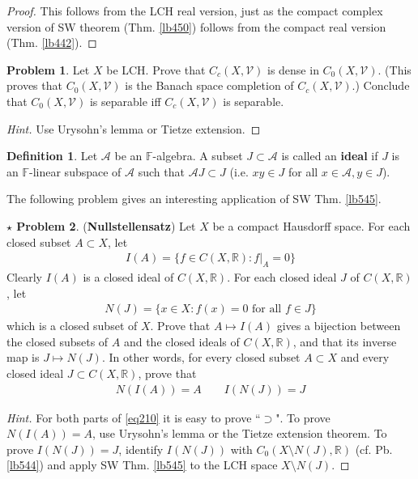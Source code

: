 \documentclass[12pt,b5paper,notitlepage]{article}
\theoremstyle{definition}
\newtheorem{df}{Definition}[section]
\newtheorem{prob}{\color{red}Problem}[section]
\newtheorem{sprob}[prob]{\color{red}$\star$ Problem}
\theoremstyle{plain}
\newcommand{\mc}{\mathcal}
\newcommand{\scr}{\mathscr}
\newcommand{\Rbb}{\mathbb R}
\newcommand{\Fbb}{\mathbb F}
\numberwithin{equation}{section}
\begin{document}
\begin{proof}
This follows from the LCH real version, just as the compact complex version of SW theorem (Thm. \ref{lb450}) follows from the compact real version (Thm. \ref{lb442}).
\end{proof}





\begin{prob}\label{lb485}
Let $X$ be LCH. Prove that $C_c(X,\mc V)$ is dense in $C_0(X,\mc V)$. (This proves that $C_0(X,\mc V)$ is the Banach space completion of $C_c(X,\mc V)$.) Conclude that $C_0(X,\mc V)$ is separable iff $C_c(X,\mc V)$ is separable.
\end{prob}

\begin{proof}[Hint]
Use Urysohn's lemma or Tietze extension.
\end{proof}


\begin{df}
Let $\scr A$ be an $\Fbb$-algebra. A subset $J\subset \scr A$ is called an \textbf{ideal} if $J$ is an $\Fbb$-linear subspace of $\scr A$ such that $\scr A J\subset J$ (i.e. $xy\in J$ for all $x\in\scr A,y\in J$). 
\end{df}

The following problem gives an interesting application of SW Thm. \ref{lb545}.

\begin{sprob}
(\textbf{Nullstellensatz}) \index{00@Nullstellensatz for $C(X,\Rbb)$}  Let $X$ be a compact Hausdorff space. For each closed subset $A\subset X$, let
\begin{align*}
I(A)=\{f\in C(X,\Rbb):f|_A=0\}
\end{align*} 
Clearly $I(A)$ is a closed ideal of $C(X,\Rbb)$. For each closed ideal $J$ of $C(X,\Rbb)$, let
\begin{align*}
N(J)=\{x\in X:f(x)=0\text{ for all }f\in J\}
\end{align*}
which is a closed subset of $X$. Prove that $A\mapsto I(A)$ gives a bijection between the  closed subsets of $A$ and the closed ideals of $C(X,\Rbb)$, and that its inverse map is $J\mapsto N(J)$. In other words, for every closed subset $A\subset X$ and every closed ideal $J\subset C(X,\Rbb)$, prove that
\begin{gather}
N(I(A))=A\qquad I(N(J))=J \label{eq210}
\end{gather}
\end{sprob}
\begin{proof}[Hint]
For both parts of \eqref{eq210} it is easy to prove ``$\supset$". To prove $N(I(A))= A$, use Urysohn's lemma or the Tietze extension theorem. To prove $I(N(J))=J$, identify $I(N(J))$ with $C_0(X\setminus N(J),\Rbb)$ (cf. Pb. \ref{lb544}) and apply SW Thm. \ref{lb545} to the LCH space $X\setminus N(J)$.
\end{proof}
\end{document}
